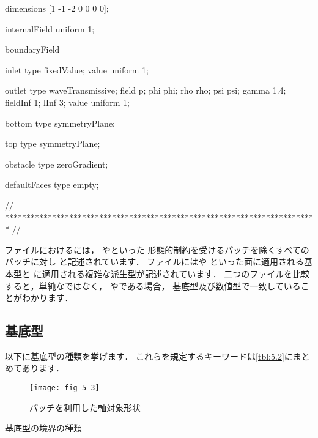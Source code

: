 \begin{OFverbatim}[file, linenum=17]
dimensions      [1 -1 -2 0 0 0 0];

internalField   uniform 1;

boundaryField
{
    inlet
    {
        type            fixedValue;
        value           uniform 1;
    }

    outlet
    {
        type            waveTransmissive;
        field           p;
        phi             phi;
        rho             rho;
        psi             psi;
        gamma           1.4;
        fieldInf        1;
        lInf            3;
        value           uniform 1;
    }

    bottom
    {
        type            symmetryPlane;
    }

    top
    {
        type            symmetryPlane;
    }

    obstacle
    {
        type            zeroGradient;
    }

    defaultFaces
    {
        type            empty;
    }
}

// ************************************************************************* //
\end{OFverbatim}
ファイルにおけるには，
やといった
形態的制約を受けるパッチを除くすべてのパッチに対し
と記述されています．
ファイルにはや
といった面に適用される基本型と
に適用される複雑な派生型が記述されています．
二つのファイルを比較すると，単純なではなく，
やである場合，
基底型及び数値型で一致していることがわかります．


\subsection{ 基底型}
\label{ssec:5.2.2}
以下に基底型の種類を挙げます．
これらを規定するキーワードは\autoref{tbl:5.2}にまとめてあります．


\begin{figure}[ht]
 \texttt{[image: fig-5-3]}
 \caption{パッチを利用した軸対象形状}
 \label{fig:5.3}
\end{figure}


\begin{table}[ht]
 
 \caption{基底型の境界の種類}
 \label{tbl:5.2}
\end{table}


